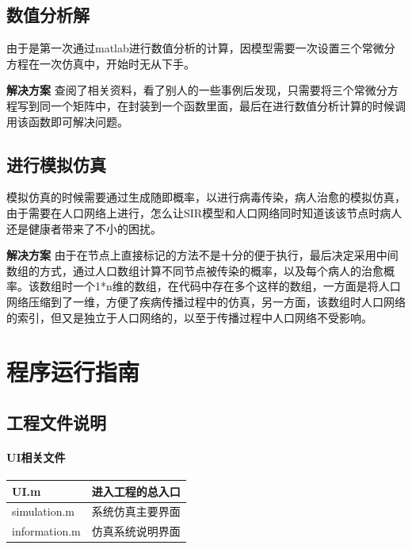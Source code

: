 \documentclass[supercite]{HustGraduPaper}
\begin{document}
	\subsection{数值分析解}
	由于是第一次通过matlab进行数值分析的计算，因模型需要一次设置三个常微分方程在一次仿真中，开始时无从下手。
	\par
	\textbf{解决方案}
	查阅了相关资料，看了别人的一些事例后发现，只需要将三个常微分方程写到同一个矩阵中，在封装到一个函数里面，最后在进行数值分析计算的时候调用该函数即可解决问题。
	

	\subsection{进行模拟仿真}
	模拟仿真的时候需要通过生成随即概率，以进行病毒传染，病人治愈的模拟仿真，由于需要在人口网络上进行，怎么让SIR模型和人口网络同时知道该该节点时病人还是健康者带来了不小的困扰。
	\par
	\textbf{解决方案}
	由于在节点上直接标记的方法不是十分的便于执行，最后决定采用中间数组的方式，通过人口数组计算不同节点被传染的概率，以及每个病人的治愈概率。该数组时一个1*n维的数组，在代码中存在多个这样的数组，一方面是将人口网络压缩到了一维，方便了疾病传播过程中的仿真，另一方面，该数组时人口网络的索引，但又是独立于人口网络的，以至于传播过程中人口网络不受影响。

	\section{程序运行指南}
	\subsection{工程文件说明}
	\paragraph{UI相关文件}
	\begin{center}
		\begin{tabular}{|m{13em}|m{13em}|}
		\hline
		UI.m & 进入工程的总入口\\
		\hline
		simulation.m & 系统仿真主要界面\\
		\hline
		information.m & 仿真系统说明界面\\
		\hline
		\end{tabular}
	\end{center}
\end{document}

